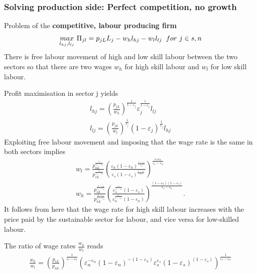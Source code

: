 \subsubsection{Solving production side: Perfect competition, no growth}
Problem of the \textbf{competitive, labour producing firm}
\begin{align*}
\underset{l_{hj}, l_{lj}}{max}\  \Pi_{jl}=p_{jL}L_j-w_hl_{hj}-w_ll_{lj} \hspace{2mm} for \ j\in{s,n}
\end{align*}
There is free labour movement of high and low skill labour between the two sectors so that there are two wages $w_h$ for high skill labour and $w_l$ for low skill labour. 

Profit maximisation in sector j yields
\begin{align*}
l_{hj}= \left(\frac{p_{jL}}{w_h}\right)^{\frac{1}{1-\varepsilon_j}}\varepsilon_j^{\frac{1}{1-\varepsilon_j}}l_{lj}\\
l_{lj}= \left(\frac{p_{jL}}{w_l}\right)^\frac{1}{\varepsilon_j}(1-\varepsilon_j)^\frac{1}{\varepsilon_j}l_{hj}
\end{align*}
Exploiting free labour movement and imposing that the wage rate is the same in both sectors implies
\begin{align*}
 w_l= \frac{p_{nL}^\frac{\varepsilon_s}{\varepsilon_s-\varepsilon_n}}{p_{sL}^\frac{\varepsilon_n}{\varepsilon_s-\varepsilon_n}}\left(\frac{\varepsilon_n(1-\varepsilon_n)^\frac{1-\varepsilon_n}{\varepsilon_n}}{\varepsilon_s(1-\varepsilon_s)^\frac{1-\varepsilon_s}{\varepsilon_s}}\right)^\frac{\varepsilon_s\varepsilon_n}{\varepsilon_s-\varepsilon_n}\\
 w_h= \frac{p_{sL}^\frac{1-\varepsilon_n}{\varepsilon_s-\varepsilon_n}}{p_{nL}^\frac{1-\varepsilon_s}{\varepsilon_s-\varepsilon_n}}\left(\frac{\varepsilon_s^\frac{\varepsilon_s}{1-\varepsilon_s}(1-\varepsilon_s)}{\varepsilon_n^\frac{\varepsilon_n}{1-\varepsilon_n}(1-\varepsilon_n)}\right)^\frac{(1-\varepsilon_n)(1-\varepsilon_s)}{\varepsilon_s-\varepsilon_n}.
\end{align*}
It follows from here that the wage rate for high skill labour increases with the price paid by the sustainable sector for labour, and vice versa for low-skilled labour. 

The ratio of wage rates $\frac{w_h}{w_l}$ reads
\begin{align}
\frac{w_h}{w_l}=\left(\frac{p_{sL}}{p_{nL}}\right)^\frac{1}{\varepsilon_s-\varepsilon_n}\left(\varepsilon_n^{-\varepsilon_n} (1-\varepsilon_n)^{-(1-\varepsilon_n)}\varepsilon_s^{\varepsilon_s} (1-\varepsilon_s)^{(1-\varepsilon_s)} \right)^\frac{1}{\varepsilon_s-\varepsilon_n}\label{eq:labourFirm_labrel}
\end{align}

